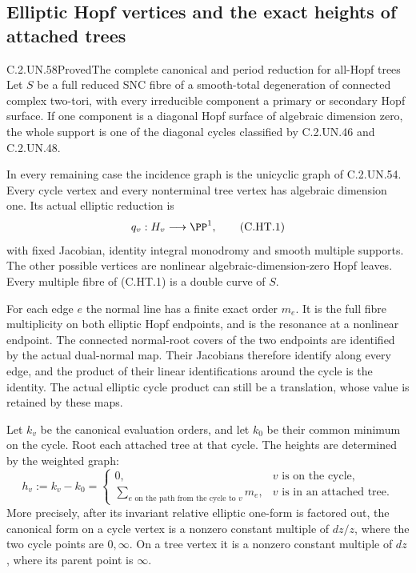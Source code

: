\subsection{Elliptic Hopf vertices and the exact heights of attached trees}

\begin{statement}{C.2.UN.58}{Proved}{The complete canonical and period reduction for all-Hopf trees}
Let $S$ be a full reduced SNC fibre of a smooth-total degeneration
of connected complex two-tori, with every irreducible component a
primary or secondary Hopf surface. If one component is a diagonal
Hopf surface of algebraic dimension zero, the whole support is
one of the diagonal cycles classified by C.2.UN.46 and C.2.UN.48.

In every remaining case the incidence graph is the unicyclic graph
of C.2.UN.54. Every cycle vertex and every nonterminal tree vertex
has algebraic dimension one. Its actual elliptic reduction is
\[
                    q_v:H_v\longrightarrow\PP^1,        \tag{C.HT.1}
\]
with fixed Jacobian, identity integral monodromy and smooth multiple
supports. The other possible vertices are nonlinear
algebraic-dimension-zero Hopf leaves. Every multiple fibre of
(C.HT.1) is a double curve of $S$.

For each edge $e$ the normal line has a finite exact order $m_e$.
It is the full fibre multiplicity on both elliptic Hopf endpoints,
and is the resonance at a nonlinear endpoint. The connected
normal-root covers of the two endpoints are identified by the
actual dual-normal map. Their Jacobians therefore identify along
every edge, and the product of their linear identifications around
the cycle is the identity. The actual elliptic cycle product can
still be a translation, whose value is retained by these maps.

Let $k_v$ be the canonical evaluation orders, and let $k_0$ be their
common minimum on the cycle. Root each attached tree at that cycle.
The heights are determined by the weighted graph:
\[
 h_v:=k_v-k_0=
 \begin{cases}
 0,&v\text{ is on the cycle},\\
 \displaystyle\sum_{e\text{ on the path from the cycle to }v}m_e,
       &v\text{ is in an attached tree}.
 \end{cases}                                           \tag{C.HT.2}
\]
More precisely, after its invariant relative elliptic one-form is
factored out, the canonical form on a cycle vertex is a nonzero
constant multiple of $dz/z$, where the two cycle points are
$0,\infty$. On a tree vertex it is a nonzero constant multiple of
$dz$, where its parent point is $\infty$.


\end{statement}
